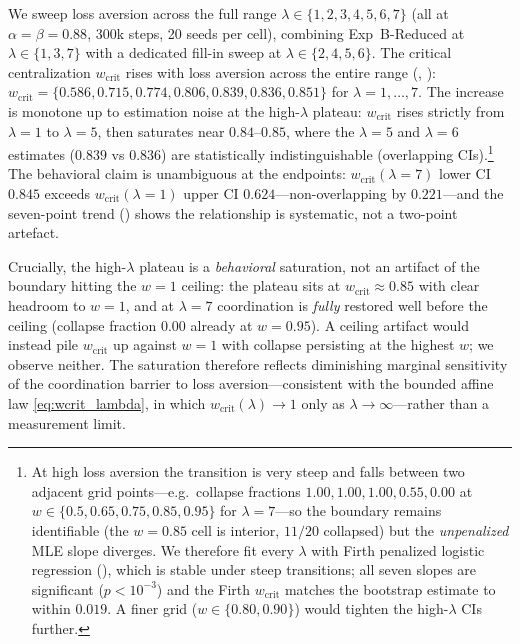 \documentclass[letterpaper]{article}
\theoremstyle{plain}
\newcommand{\wcrit}{w_{\mathrm{crit}}}
\begin{document}
We sweep loss aversion across the full range $\lambda \in \{1,2,3,4,5,6,7\}$
(all at $\alpha{=}\beta{=}0.88$, 300k steps, 20 seeds per cell), combining
Exp~B-Reduced at $\lambda \in \{1,3,7\}$ with a dedicated fill-in sweep at
$\lambda \in \{2,4,5,6\}$.
The critical centralization $\wcrit$ rises with loss aversion across the entire
range (, ):
$\wcrit = \{0.586, 0.715, 0.774, 0.806, 0.839, 0.836, 0.851\}$ for
$\lambda = 1,\ldots,7$.
The increase is monotone up to estimation noise at the high-$\lambda$ plateau:
$\wcrit$ rises strictly from $\lambda{=}1$ to $\lambda{=}5$, then saturates near
$0.84$--$0.85$, where the $\lambda{=}5$ and $\lambda{=}6$ estimates
($0.839$ vs $0.836$) are statistically indistinguishable (overlapping CIs).\footnote{%
  At high loss aversion the transition is very steep and falls between two
  adjacent grid points---e.g.\ collapse fractions $1.00, 1.00, 1.00, 0.55, 0.00$
  at $w \in \{0.5, 0.65, 0.75, 0.85, 0.95\}$ for $\lambda{=}7$---so the boundary
  remains identifiable (the $w{=}0.85$ cell is interior, $11/20$ collapsed) but
  the \emph{unpenalized} MLE slope diverges. We therefore fit every $\lambda$ with
  Firth penalized logistic regression (), which is stable
  under steep transitions; all seven slopes are significant ($p<10^{-3}$) and the
  Firth $\wcrit$ matches the bootstrap estimate to within $0.019$. A finer grid
  ($w\in\{0.80,0.90\}$) would tighten the high-$\lambda$ CIs further.}
The behavioral claim is unambiguous at the endpoints: $\wcrit(\lambda{=}7)$
lower CI $0.845$ exceeds $\wcrit(\lambda{=}1)$ upper CI $0.624$---non-overlapping
by $0.221$---and the seven-point trend () shows the
relationship is systematic, not a two-point artefact.

Crucially, the high-$\lambda$ plateau is a \emph{behavioral} saturation, not an
artifact of the boundary hitting the $w{=}1$ ceiling: the plateau sits at
$\wcrit\approx0.85$ with clear headroom to $w{=}1$, and at $\lambda{=}7$
coordination is \emph{fully} restored well before the ceiling (collapse fraction
$0.00$ already at $w{=}0.95$). A ceiling artifact would instead pile $\wcrit$ up
against $w{=}1$ with collapse persisting at the highest $w$; we observe neither.
The saturation therefore reflects diminishing marginal sensitivity of the
coordination barrier to loss aversion---consistent with the bounded affine law
\eqref{eq:wcrit_lambda}, in which $\wcrit(\lambda)\to1$ only as
$\lambda\to\infty$---rather than a measurement limit.
\end{document}
